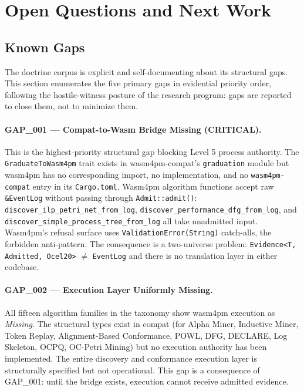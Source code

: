 \section{Open Questions and Next Work}
\label{sec:doctrine-open}

\subsection{Known Gaps}
\label{sec:doctrine-open-gaps}

The doctrine corpus is explicit and self-documenting about its structural gaps. This section
enumerates the five primary gaps in evidential priority order, following the hostile-witness
posture of the research program: gaps are reported to close them, not to minimize them.

\paragraph{GAP\_001 --- Compat-to-Wasm Bridge Missing (CRITICAL).}
This is the highest-priority structural gap blocking Level 5 process authority. The
\texttt{GraduateToWasm4pm} trait exists in wasm4pm-compat's \texttt{graduation} module but
wasm4pm has no corresponding import, no implementation, and no \texttt{wasm4pm-compat} entry
in its \texttt{Cargo.toml}. Wasm4pm algorithm functions accept raw \texttt{\&EventLog}
without passing through \texttt{Admit::admit()}: \texttt{discover\_ilp\_petri\_net\_from\_log},
\texttt{discover\_performance\_dfg\_from\_log}, and \texttt{discover\_simple\_process\_tree\_from\_log}
all take unadmitted input. Wasm4pm's refusal surface uses \texttt{ValidationError(String)}
catch-alls, the forbidden anti-pattern. The consequence is a two-universe problem:
\texttt{Evidence\textless{}T, Admitted, Ocel20\textgreater{}} $\neq$ \texttt{EventLog} and
there is no translation layer in either codebase.

\paragraph{GAP\_002 --- Execution Layer Uniformly Missing.}
All fifteen algorithm families in the taxonomy show wasm4pm execution as \emph{Missing}.
The structural types exist in compat (for Alpha Miner, Inductive Miner, Token Replay,
Alignment-Based Conformance, POWL, DFG, DECLARE, Log Skeleton, OCPQ, OC-Petri Mining) but
no execution authority has been implemented. The entire discovery and conformance execution
layer is structurally specified but not operational. This gap is a consequence of GAP\_001:
until the bridge exists, execution cannot receive admitted evidence.

